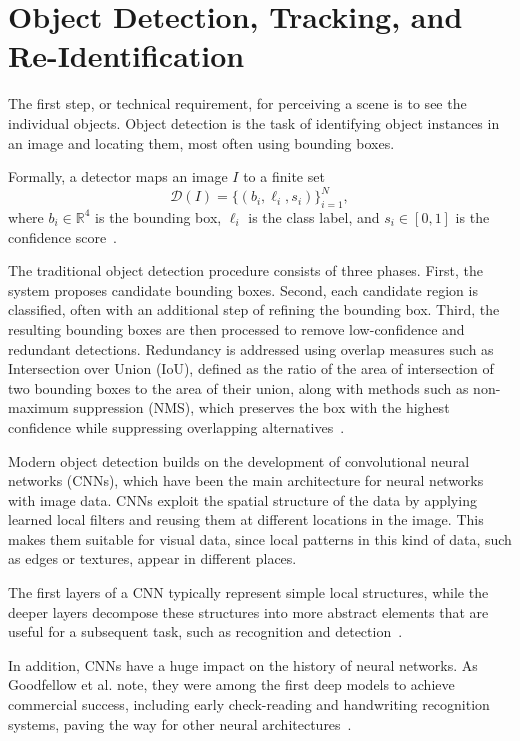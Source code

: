 \section{Object Detection, Tracking, and Re-Identification}\label{sec:object-detection-tracking-reid}

The first step, or technical requirement, for perceiving a scene is to see the individual objects. Object detection is the task of identifying object instances in an image and locating them, most often using bounding boxes.

Formally, a detector maps an image \(I\) to a finite set
\[
\mathcal{D}(I)=\{(b_i,\ell_i,s_i)\}_{i=1}^{N},
\]
where \(b_i\in\mathbb{R}^4\) is the bounding box, \(\ell_i\) is the class label, and \(s_i\in[0,1]\) is the confidence score~\cite[Section 50.4.1]{foundationsCVbook}.

The traditional object detection procedure consists of three phases. First, the system proposes candidate bounding boxes. Second, each candidate region is classified, often with an additional step of refining the bounding box. Third, the resulting bounding boxes are then processed to remove low-confidence and redundant detections. Redundancy is addressed using overlap measures such as Intersection over Union (IoU), defined as the ratio of the area of intersection of two bounding boxes to the area of their union, along with methods such as non-maximum suppression (NMS), which preserves the box with the highest confidence while suppressing overlapping alternatives~\cite[Section 50.4.1.2]{foundationsCVbook}.

Modern object detection builds on the development of convolutional neural networks (CNNs), which have been the main architecture for neural networks with image data. CNNs exploit the spatial structure of the data by applying learned local filters and reusing them at different locations in the image. This makes them suitable for visual data, since local patterns in this kind of data, such as edges or textures, appear in different places.

The first layers of a CNN typically represent simple local structures, while the deeper layers decompose these structures into more abstract elements that are useful for a subsequent task, such as recognition and detection~\cite[439]{lecun_deep_2015}.

In addition, CNNs have a huge impact on the history of neural networks. As Goodfellow et al. note, they were among the first deep models to achieve commercial success, including early check-reading and handwriting recognition systems, paving the way for other neural architectures~\cite[365]{Goodfellow-et-al-2016}.


